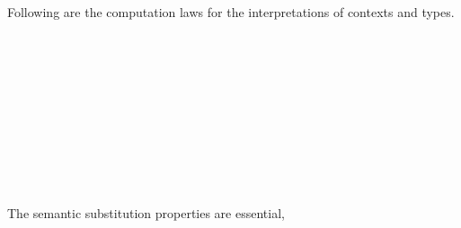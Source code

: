 Following are the computation laws for the interpretations of contexts and types.

\begin{code}\>\<%
\\
\>[2]\<[4]%
\>[4] \<[13]%
\>[13]\AgdaSymbol{:}     \<%
\\
\>[2]\<[4]%
\>[4] \<[13]%
\>[13]\AgdaSymbol{:}  \AgdaSymbol{\{} \AgdaSymbol{\}}    \AgdaInductiveConstructor{,}    \<[38]%
\>[38]\<%
\\
\>[4]\<[25]%
\>[25]      \<[40]%
\>[40]      \AgdaSymbol{)}\<%
\\
\>[0]\<[4]%
\>[4]\<%
\\
\>[0]\<[4]%
\>[4] \<[13]%
\>[13]\AgdaSymbol{:} \AgdaSymbol{\}\{} \AgdaSymbol{:}   \AgdaSymbol{\}}   \AgdaInductiveConstructor{*}    \<%
\\
\>[0]\<[4]%
\>[4] \<[13]%
\>[13]\AgdaSymbol{:}    \AgdaSymbol{\}\{} \AgdaSymbol{:}   \AgdaSymbol{\}}\<%
\\
\>[4]\<[13]%
\>[13]       \<%
\\
\>[13]\<[15]%
\>[15] \AgdaSymbol{(} \AgdaSymbol{(}   \AgdaSymbol{)} \AgdaSymbol{(}   \AgdaSymbol{)} \AgdaSymbol{(}   \AgdaSymbol{))}\<%
\\
\>\<\end{code}
The semantic substitution properties are essential,

